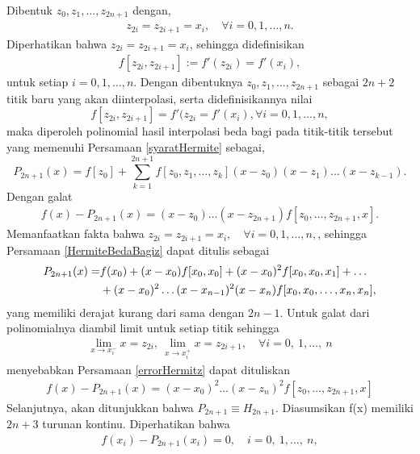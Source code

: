 Dibentuk \(z_0,z_1,\dots,z_{2n+1}\) dengan,
\begin{align}\label{ztox}
    z_{2i}=z_{2i+1}=x_i,\quad \forall i = 0,1,\dots,n.
\end{align}
Diperhatikan bahwa $z_{2i}=z_{2i+1}=x_i$, sehingga didefinisikan  
\begin{align*}
  f[z_{2i},z_{2i+1}] := f'(z_{2i}) = f'(x_i),  
\end{align*}
untuk setiap $i=0,1,\dots,n$.
Dengan dibentuknya \(z_0,z_1,\dots,z_{2n+1}\) sebagai $2n+2$ titik baru yang akan diinterpolasi, serta didefinisikannya nilai 
$$f[z_{2i},z_{2i+1}] = f'(z_{2i} = f'(x_i), \forall i = 0,1,\dots,n,$$
maka diperoleh polinomial hasil interpolasi beda bagi pada titik-titik tersebut yang memenuhi Persamaan \eqref{syaratHermite} sebagai,
\begin{equation}\label{HermiteBedaBagiz}
	P_{2n+1}(x) = f[z_0] + \sum_{k=1}^{2n+1}f[z_0,z_1,\dots,z_k](x-z_0)(x-z_1)\dots(x-z_{k-1}).
\end{equation}
Dengan galat
\begin{gather}\label{errorHermitz}
    f(x) - P_{2n+1}(x) = (x-z_0)\dots(x-z_{2n+1})f[z_0,\dots,z_{2n+1},x].
\end{gather}
Memanfaatkan fakta bahwa $z_{2i}=z_{2i+1}=x_i,\quad \forall i = 0,1,\dots,n,$, sehingga Persamaan \eqref{HermiteBedaBagiz} dapat ditulis sebagai
\begin{align}\label{HermiteBedaBagi}
    P_{2n+1}(x)=&f(x_0) + (x-x_0)f[x_0,x_0]+(x-x_0)^2f[x_0,x_0,x_1]+\dots \notag \\
    &+(x-x_0)^2\dots(x-x_{n-1})^2(x-x_n)f[x_0,x_0,\dots,x_n,x_n],
\end{align}
yang memiliki derajat kurang dari sama dengan $2n-1$. Untuk galat dari polinomialnya diambil limit untuk setiap titik sehingga
\begin{gather*}
    \lim_{x \to x_i^-}x = z_{2i},~ \lim_{x \to x_i^+}x = z_{2i+1}, \quad \forall i = 0, ~1, \dots, ~n
\end{gather*}
menyebabkan Persamaan \eqref{errorHermitz} dapat dituliskan
\begin{gather}\label{errorHermite}
    f(x) - P_{2n+1}(x) = (x-x_0)^2\dots(x-z_{n})^2f[z_0,\dots,z_{2n+1},x]
\end{gather}
Selanjutnya, akan ditunjukkan bahwa $P_{2n+1} \equiv H_{2n+1}$. Diasumsikan f(x) memiliki $2n+3$ turunan kontinu. Diperhatikan bahwa
\begin{gather*}
    f(x_i) - P_{2n+1}(x_i) = 0, \quad i = 0,~1,\dots,~n,
\end{gather*}
